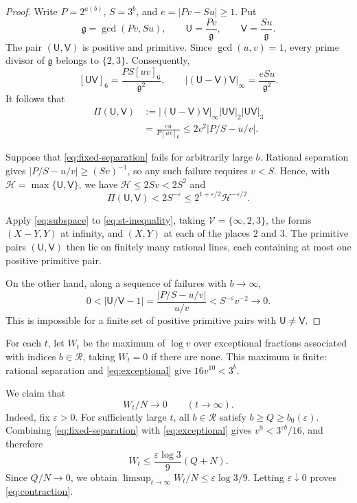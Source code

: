 \documentclass[11pt,reqno]{amsart}
\theoremstyle{definition}
\theoremstyle{plain}
\theoremstyle{definition}
\theoremstyle{remark}
\newcommand{\RR}{\mathcal R}
\begin{document}
\begin{proof}
Write $P=2^{a(b)}$, $S=3^b$, and
$e=|Pv-Su|\ge1$. Put
\[
 \mathfrak g=\gcd(Pv,Su),\qquad
 \mathsf U=\frac{Pv}{\mathfrak g},\qquad
 \mathsf V=\frac{Su}{\mathfrak g}.
\]
The pair $(\mathsf U,\mathsf V)$ is positive and primitive.
Since $\gcd(u,v)=1$, every prime divisor of $\mathfrak g$
belongs to $\{2,3\}$. Consequently,
\[
 [\mathsf U\mathsf V]_6
 =\frac{PS[uv]_6}{\mathfrak g^2},
 \qquad
 |(\mathsf U-\mathsf V)\mathsf V|_\infty
 =\frac{eSu}{\mathfrak g^2}.
\]
It follows that
\[
 \begin{aligned}
 \Pi(\mathsf U,\mathsf V)
 &:=
 |(\mathsf U-\mathsf V)\mathsf V|_\infty
 |\mathsf U\mathsf V|_2|\mathsf U\mathsf V|_3\\
 &=\frac{eu}{P[uv]_6}
 \le2v^2|P/S-u/v|.
 \end{aligned}
\]

Suppose that \eqref{eq:fixed-separation} fails for
arbitrarily large $b$. Rational separation gives
$|P/S-u/v|\ge(Sv)^{-1}$, so any such failure
requires $v<S$. Hence, with
$\mathcal H=\max\{\mathsf U,\mathsf V\}$,
we have $\mathcal H\le2Sv<2S^2$ and
\begin{equation}\label{eq:st-inequality}
 \Pi(\mathsf U,\mathsf V)
 <2S^{-\varepsilon}
 \le2^{1+\varepsilon/2}\mathcal H^{-\varepsilon/2}.
\end{equation}

Apply \eqref{eq:subspace} to
\eqref{eq:st-inequality}, taking
$\mathcal V=\{\infty,2,3\}$, the forms
$(X-Y,Y)$ at infinity, and $(X,Y)$ at
each of the places $2$ and $3$.
The primitive pairs $(\mathsf U,\mathsf V)$
then lie on finitely many rational lines,
each containing at most one positive primitive pair.

On the other hand, along a sequence of failures
with $b\to\infty$,
\[
 0<|\mathsf U/\mathsf V-1|
 =\frac{|P/S-u/v|}{u/v}
 <S^{-\varepsilon}v^{-2}\longrightarrow0.
\]
This is impossible for a finite set of positive
primitive pairs with $\mathsf U\ne\mathsf V$.
\end{proof}

For each $t$, let $W_t$ be the maximum of $\log v$
over exceptional fractions associated with indices
$b\in\RR$, taking $W_t=0$ if there are none.
This maximum is finite: rational separation and
\eqref{eq:exceptional} give $16v^{10}<3^b$.

We claim that
\begin{equation}\label{eq:contraction}
 W_t/N\longrightarrow0\qquad(t\to\infty).
\end{equation}
Indeed, fix $\varepsilon>0$. For sufficiently large $t$,
all $b\in\RR$ satisfy $b\ge Q\ge b_0(\varepsilon)$.
Combining \eqref{eq:fixed-separation} with
\eqref{eq:exceptional} gives
$v^9<3^{\varepsilon b}/16$, and therefore
\[
 W_t\le\frac{\varepsilon\log3}{9}(Q+N).
\]
Since $Q/N\to0$, we obtain
$\limsup_{t\to\infty}W_t/N\le\varepsilon\log3/9$.
Letting $\varepsilon\downarrow0$ proves
\eqref{eq:contraction}.
\end{document}
